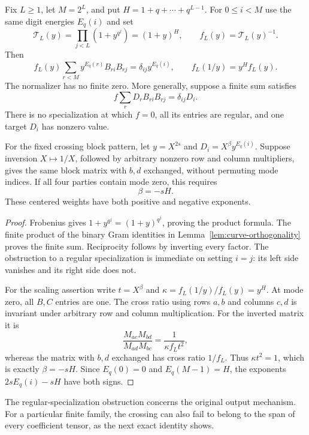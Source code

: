 \begin{proposition}\label{prop:finite-kernel-gates}
Fix $L\geq1$, let $M=2^L$, and put
$H=1+q+\cdots+q^{L-1}$. For $0\leq i<M$ use the same digit energies $E_q(i)$ and set
\[
 \mathcal T_L(y)=\prod_{j<L}(1+y^{q^j})=(1+y)^H,
 \qquad f_L(y)=\mathcal T_L(y)^{-1}.
\]
Then
\[
 f_L(y)\sum_{r<M}y^{E_q(r)}B_{ri}B_{rj}
 =\delta_{ij}y^{E_q(i)},\qquad
 f_L(1/y)=y^Hf_L(y).
\]
The normalizer has no finite zero. More generally, suppose a finite sum satisfies
\[
 f\sum_rD_rB_{ri}B_{rj}=\delta_{ij}D_i.
\]
There is no specialization at which $f=0$, all its entries are regular, and one target $D_i$ has nonzero value.

For the fixed crossing block pattern, let $y=X^{2s}$ and $D_i=X^\beta y^{E_q(i)}$. Suppose inversion $X\mapsto1/X$, followed by arbitrary nonzero row and column multipliers, gives the same block matrix with $b,d$ exchanged, without permuting mode indices. If all four parties contain mode zero, this requires
\[
 \beta=-sH.
\]
These centered weights have both positive and negative exponents.
\end{proposition}
\begin{proof}
Frobenius gives $1+y^{q^j}=(1+y)^{q^j}$, proving the product formula. The finite product of the binary Gram identities in Lemma~\ref{lem:curve-orthogonality} proves the finite sum. Reciprocity follows by inverting every factor. The obstruction to a regular specialization is immediate on setting $i=j$: its left side vanishes and its right side does not.

For the scaling assertion write $t=X^\beta$ and $\kappa=f_L(1/y)/f_L(y)=y^H$. At mode zero, all $B,C$ entries are one. The cross ratio using rows $a,b$ and columns $c,d$ is invariant under arbitrary row and column multiplication. For the inverted matrix it is
\[
 \frac{M_{ac}M_{bd}}{M_{ad}M_{bc}}
 =\frac1{\kappa f_Lt^2},
\]
whereas the matrix with $b,d$ exchanged has cross ratio $1/f_L$. Thus $\kappa t^2=1$, which is exactly $\beta=-sH$. Since $E_q(0)=0$ and $E_q(M-1)=H$, the exponents $2sE_q(i)-sH$ have both signs.
\end{proof}

The regular-specialization obstruction concerns the original output mechanism. For a particular finite family, the crossing can also fail to belong to the span of every coefficient tensor, as the next exact identity shows.

